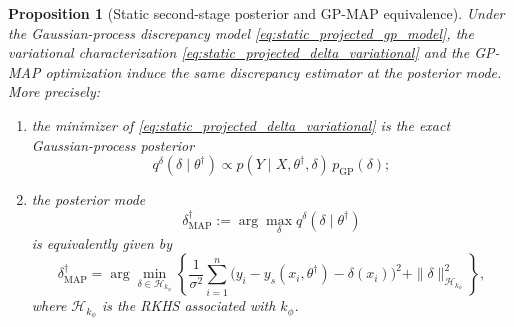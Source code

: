 \documentclass{article}
\newtheorem{proposition}{Proposition}
\begin{document}
\begin{proposition}[Static second-stage posterior and GP-MAP equivalence]
\label{prop:static_delta_posterior_map_equiv}
Under the Gaussian-process discrepancy model \eqref{eq:static_projected_gp_model}, the variational characterization \eqref{eq:static_projected_delta_variational} and the GP-MAP optimization induce the same discrepancy estimator at the posterior mode. More precisely:
\begin{enumerate}[leftmargin=1.5em]
    \item the minimizer of \eqref{eq:static_projected_delta_variational} is the exact Gaussian-process posterior
    \begin{equation}
    q^\delta(\delta \mid \theta^\dagger)
    \propto
    p(Y \mid X,\theta^\dagger,\delta)\,p_{\mathrm{GP}}(\delta);
    \label{eq:static_delta_exact_posterior_prop}
    \end{equation}
    \item the posterior mode
    \begin{equation}
    \delta^\dagger_{\mathrm{MAP}}
    :=
    \arg\max_\delta q^\delta(\delta \mid \theta^\dagger)
    \label{eq:static_delta_map_def}
    \end{equation}
    is equivalently given by
    \begin{equation}
    \delta^\dagger_{\mathrm{MAP}}
    =
    \arg\min_{\delta \in \mathcal H_{k_\phi}}
    \left\{
    \frac{1}{\sigma^2}
    \sum_{i=1}^n
    \big(
    y_i-y_s(x_i,\theta^\dagger)-\delta(x_i)
    \big)^2
    +
    \|\delta\|_{\mathcal H_{k_\phi}}^2
    \right\},
    \label{eq:static_delta_map_rkhs_prop}
    \end{equation}
    where $\mathcal H_{k_\phi}$ is the RKHS associated with $k_\phi$.
\end{enumerate}
\end{proposition}
\end{document}
